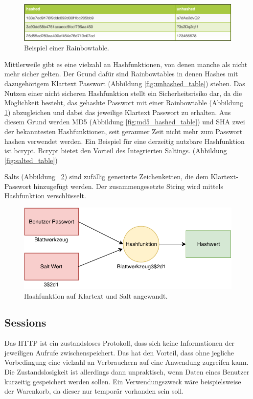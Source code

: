 \begin{figure}
	\includegraphics[width=\textwidth]{graphics/rainbowtable.pdf}
	\caption{Beispiel einer Rainbowtable.}
	\label{fig:rainbowtable}
\end{figure}

Mittlerweile gibt es eine vielzahl an Hashfunktionen, von denen manche als nicht mehr sicher gelten. Der Grund dafür sind Rainbowtables in denen Hashes mit dazugehörigem Klartext Passwort (Abbildung \ref{fig:unhashed_table}) stehen. Das Nutzen einer nicht sicheren Hashfunktion stellt ein Sicherheitsrisiko dar, da die Möglichkeit besteht, das gehashte Passwort mit einer Rainbowtable (Abbildung \ref{fig:rainbowtable}) abzugleichen und dabei das jeweilige Klartext Passwort zu erhalten. Aus diesem Grund werden MD5 (Abbildung \ref{fig:md5_hashed_table}) und SHA zwei der bekanntesten Hashfunktionen, seit geraumer Zeit nicht mehr zum Passwort hashen verwendet werden. Ein Beispiel für eine derzeitig nutzbare Hashfunktion ist bcrypt. Bcrypt bietet den Vorteil des Integrierten Saltings. (Abbildung \ref{fig:salted_table})

Salts (Abbildung ~\ref{fig:salted-hash}) sind zufällig generierte Zeichenketten, die dem Klartext-Passwort hinzugefügt werden. Der zusammengesetzte String wird mittels Hashfunktion verschlüsselt.

\begin{figure}
	\centering
	\includegraphics[width=.7\textwidth]{graphics/salting.pdf}
	\caption{Hashfunktion auf Klartext und Salt angewandt.}
	\label{fig:salted-hash}
\end{figure}

\subsection{Sessions}
\label{sec: sessions}
Das \gls{HTTP} ist ein zustandsloses Protokoll, dass sich keine Informationen der jeweiligen Aufrufe zwischenspeichert. Das hat den Vorteil, dass ohne jegliche Vorbedingung eine vielzahl an Verbrauchern auf eine Anwendung zugreifen kann. Die Zustandslosigkeit ist allerdings dann unpraktisch, wenn Daten eines Benutzer kurzeitig gespeichert werden sollen. Ein Verwendungszweck wäre beispielsweise der Warenkorb, da dieser nur temporär vorhanden sein soll. 

